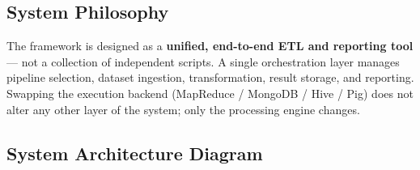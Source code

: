 \documentclass[11pt,a4paper]{article}
\begin{document}
\subsection{System Philosophy}

The framework is designed as a \textbf{unified, end-to-end ETL and reporting tool} --- not a collection of independent scripts. A single orchestration layer manages pipeline selection, dataset ingestion, transformation, result storage, and reporting. Swapping the execution backend (MapReduce / MongoDB / Hive / Pig) does not alter any other layer of the system; only the processing engine changes.

\subsection{System Architecture Diagram}
\end{document}

